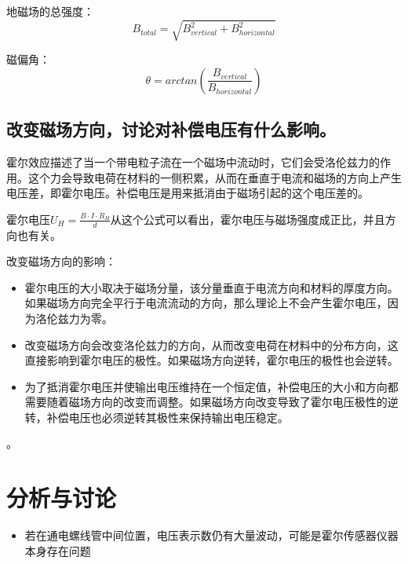 \documentclass{article}
\begin{document}
地磁场的总强度：
\begin{equation*}
    B_{total} = \sqrt{B_{vertical}^2 + B_{horizontal}^2}
\end{equation*}

磁偏角：
\begin{equation*}
    \theta = arctan \left( \frac{B_{vertical}}{B_{horizontal}} \right)
\end{equation*}

\subsection{改变磁场方向，讨论对补偿电压有什么影响。}
霍尔效应描述了当一个带电粒子流在一个磁场中流动时，它们会受洛伦兹力的作用。这个力会导致电荷在材料的一侧积累，从而在垂直于电流和磁场的方向上产生电压差，即霍尔电压。补偿电压是用来抵消由于磁场引起的这个电压差的。

霍尔电压$U_H = \frac{B \cdot I \cdot R_H}{d}$从这个公式可以看出，霍尔电压与磁场强度成正比，并且方向也有关。

改变磁场方向的影响：

\begin{itemize}
    \item 霍尔电压的大小取决于磁场分量，该分量垂直于电流方向和材料的厚度方向。如果磁场方向完全平行于电流流动的方向，那么理论上不会产生霍尔电压，因为洛伦兹力为零。
    \item 改变磁场方向会改变洛伦兹力的方向，从而改变电荷在材料中的分布方向，这直接影响到霍尔电压的极性。如果磁场方向逆转，霍尔电压的极性也会逆转。
    \item 为了抵消霍尔电压并使输出电压维持在一个恒定值，补偿电压的大小和方向都需要随着磁场方向的改变而调整。如果磁场方向改变导致了霍尔电压极性的逆转，补偿电压也必须逆转其极性来保持输出电压稳定。
\end{itemize}。

\section{分析与讨论}
\begin{itemize}
    \item 若在通电螺线管中间位置，电压表示数仍有大量波动，可能是霍尔传感器仪器本身存在问题
\end{itemize}
\end{document}
